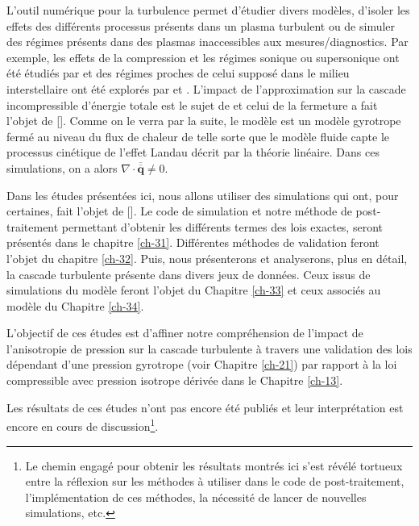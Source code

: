L'outil numérique pour la turbulence permet d'étudier divers modèles, d'isoler les effets des différents processus présents dans un plasma turbulent ou de simuler des régimes présents dans des plasmas inaccessibles aux mesures/diagnostics. Par exemple, les effets de la compression et les régimes sonique ou supersonique ont été étudiés par \cite{andres_energy_2018} et des régimes proches de celui supposé dans le milieu interstellaire ont été explorés par \cite{federrath_comparing_2010} et \cite{ferrand_compressible_2020}. L'impact de l'approximation  sur la cascade incompressible d'énergie totale est le sujet de \cite{ferrand_exact_2019} et celui de la fermeture  a fait l'objet de [\cite{ferrand_fluid_2021}]. Comme on le verra par la suite, le modèle  est un modèle gyrotrope fermé au niveau du flux de chaleur de telle sorte que le modèle fluide capte le processus cinétique de l'effet Landau décrit par la théorie linéaire. Dans ces simulations, on a alors $\nabla \cdot \overline{\overline{\boldsymbol{q}}} \neq 0$.

Dans les études présentées ici, nous allons utiliser des simulations qui ont, pour certaines, fait l'objet de [\cite{ferrand_fluid_2021}]. Le code de simulation et notre méthode de post-traitement permettant d'obtenir les différents termes des lois exactes, seront présentés dans le chapitre \ref{ch-31}. Différentes méthodes de validation feront l'objet du chapitre \ref{ch-32}. Puis, nous présenterons et analyserons, plus en détail, la cascade turbulente présente dans divers jeux de données. Ceux issus de simulations du modèle  feront l'objet du Chapitre \ref{ch-33} et ceux associés au modèle  du Chapitre \ref{ch-34}.  

L'objectif de ces études est d'affiner notre compréhension de l'impact de l'anisotropie de pression sur la cascade turbulente à travers une validation des lois dépendant d'une pression gyrotrope (voir Chapitre \ref{ch-21}) par rapport à la loi compressible avec pression isotrope dérivée dans le Chapitre \ref{ch-13}. 

Les résultats de ces études n'ont pas encore été publiés et leur interprétation est encore en cours de discussion\footnote{Le chemin engagé pour obtenir les résultats montrés ici s'est révélé tortueux entre la réflexion sur les méthodes à utiliser dans le code de post-traitement, l'implémentation de ces méthodes, la nécessité de lancer de nouvelles simulations, etc. }.

\newpage

